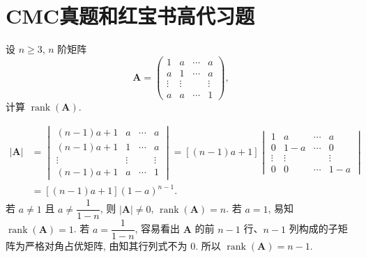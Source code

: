 \documentclass[../../main.tex]{subfiles}%
\begin{document}
\section{CMC真题和红宝书高代习题}

\begin{example}
设 \(n \geqslant 3\), \(n\) 阶矩阵
\[
\boldsymbol{A} = \begin{pmatrix} 1 & a & \cdots & a \\ a & 1 & \cdots & a \\ \vdots & \vdots & & \vdots \\ a & a & \cdots & 1 \end{pmatrix},
\]
计算 \(\operatorname{rank}(\boldsymbol{A})\).
\end{example}
\begin{solution}
\[
\begin{aligned}
|\boldsymbol{A}| &= \begin{vmatrix} (n - 1)a + 1 & a & \cdots & a \\ (n - 1)a + 1 & 1 & \cdots & a \\ \vdots & \vdots & & \vdots \\ (n - 1)a + 1 & a & \cdots & 1 \end{vmatrix} = [(n - 1)a + 1] \begin{vmatrix} 1 & a & \cdots & a \\ 0 & 1 - a & \cdots & 0 \\ \vdots & \vdots & & \vdots \\ 0 & 0 & \cdots & 1 - a \end{vmatrix} \\
&= [(n - 1)a + 1](1 - a)^{n - 1}.
\end{aligned}
\]
若 \(a \neq 1\) 且 \(a \neq \dfrac{1}{1 - n}\), 则 \(|\boldsymbol{A}| \neq 0\), \(\operatorname{rank}(\boldsymbol{A}) = n\). 若 \(a = 1\), 易知 \(\operatorname{rank}(\boldsymbol{A}) = 1\). 若 \(a = \dfrac{1}{1 - n}\), 容易看出 \(\boldsymbol{A}\) 的前 \(n - 1\) 行、\(n - 1\) 列构成的子矩阵为严格对角占优矩阵, 由知其行列式不为 0. 所以 \(\operatorname{rank}(\boldsymbol{A}) = n - 1\).

\end{solution}
\end{document}
